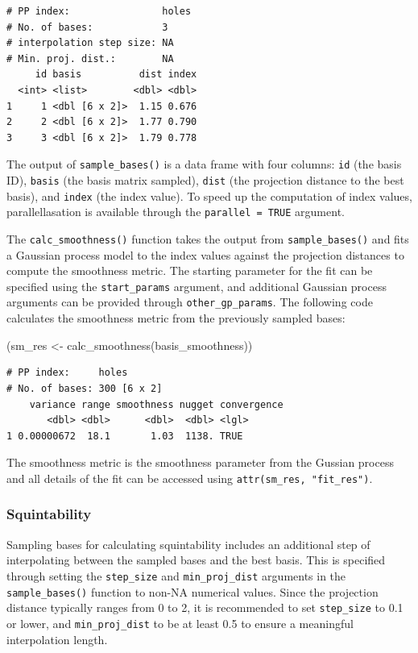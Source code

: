 \documentclass[
  12pt,
]{interact}
\newenvironment{Shaded}{\begin{snugshade}}{\end{snugshade}}
\newcommand{\FunctionTok}[1]{\textcolor[rgb]{0.28,0.35,0.67}{#1}}
\newcommand{\NormalTok}[1]{\textcolor[rgb]{0.00,0.23,0.31}{#1}}
\newcommand{\OtherTok}[1]{\textcolor[rgb]{0.00,0.23,0.31}{#1}}
\theoremstyle{plain}
\begin{document}
\begin{verbatim}
# PP index:                holes
# No. of bases:            3
# interpolation step size: NA
# Min. proj. dist.:        NA
     id basis          dist index
  <int> <list>        <dbl> <dbl>
1     1 <dbl [6 x 2]>  1.15 0.676
2     2 <dbl [6 x 2]>  1.77 0.790
3     3 <dbl [6 x 2]>  1.79 0.778
\end{verbatim}

The output of \texttt{sample\_bases()} is a data frame with four
columns: \texttt{id} (the basis ID), \texttt{basis} (the basis matrix
sampled), \texttt{dist} (the projection distance to the best basis), and
\texttt{index} (the index value). To speed up the computation of index
values, parallellasation is available through the
\texttt{parallel\ =\ TRUE} argument.

The \texttt{calc\_smoothness()} function takes the output from
\texttt{sample\_bases()} and fits a Gaussian process model to the index
values against the projection distances to compute the smoothness
metric. The starting parameter for the fit can be specified using the
\texttt{start\_params} argument, and additional Gaussian process
arguments can be provided through \texttt{other\_gp\_params}. The
following code calculates the smoothness metric from the previously
sampled bases:

\begin{Shaded}
\begin{Highlighting}[]
\NormalTok{(sm\_res }\OtherTok{\textless{}{-}} \FunctionTok{calc\_smoothness}\NormalTok{(basis\_smoothness))}
\end{Highlighting}
\end{Shaded}

\begin{verbatim}
# PP index:     holes
# No. of bases: 300 [6 x 2]
    variance range smoothness nugget convergence
       <dbl> <dbl>      <dbl>  <dbl> <lgl>      
1 0.00000672  18.1       1.03  1138. TRUE       
\end{verbatim}

The smoothness metric is the smoothness parameter from the Gussian
process and all details of the fit can be accessed using
\texttt{attr(sm\_res,\ "fit\_res")}.

\subsubsection{Squintability}\label{squintability}

Sampling bases for calculating squintability includes an additional step
of interpolating between the sampled bases and the best basis. This is
specified through setting the \texttt{step\_size} and
\texttt{min\_proj\_dist} arguments in the \texttt{sample\_bases()}
function to non-NA numerical values. Since the projection distance
typically ranges from 0 to 2, it is recommended to set
\texttt{step\_size} to 0.1 or lower, and \texttt{min\_proj\_dist} to be
at least 0.5 to ensure a meaningful interpolation length.
\end{document}
